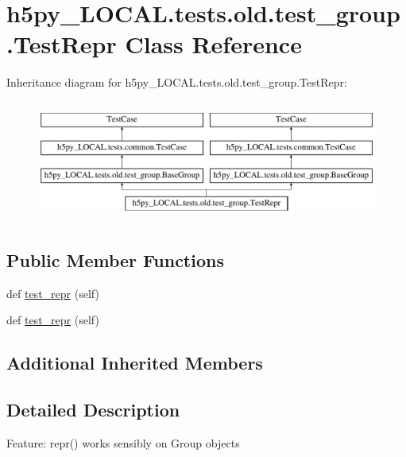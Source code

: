 \hypertarget{classh5py__LOCAL_1_1tests_1_1old_1_1test__group_1_1TestRepr}{}\section{h5py\+\_\+\+L\+O\+C\+A\+L.\+tests.\+old.\+test\+\_\+group.\+Test\+Repr Class Reference}
\label{classh5py__LOCAL_1_1tests_1_1old_1_1test__group_1_1TestRepr}
Inheritance diagram for h5py\+\_\+\+L\+O\+C\+A\+L.\+tests.\+old.\+test\+\_\+group.\+Test\+Repr\+:\begin{figure}[H]
\begin{center}
\leavevmode
\includegraphics[height=4.000000cm]{classh5py__LOCAL_1_1tests_1_1old_1_1test__group_1_1TestRepr}
\end{center}
\end{figure}
\subsection*{Public Member Functions}
\begin{DoxyCompactItemize}
\item 
def \hyperlink{classh5py__LOCAL_1_1tests_1_1old_1_1test__group_1_1TestRepr_ab8a5830c7c8ecce41c4dd7d4d35f5ffe}{test\+\_\+repr} (self)
\item 
def \hyperlink{classh5py__LOCAL_1_1tests_1_1old_1_1test__group_1_1TestRepr_ab8a5830c7c8ecce41c4dd7d4d35f5ffe}{test\+\_\+repr} (self)
\end{DoxyCompactItemize}
\subsection*{Additional Inherited Members}


\subsection{Detailed Description}
\begin{DoxyVerb}    Feature: repr() works sensibly on Group objects
\end{DoxyVerb}


